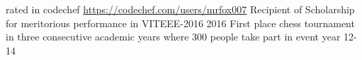 \begin{cvhonors}
   \cvhonor
      {\faStar \faStar \faStar \faStar}{rated in codechef \url{https://codechef.com/users/mrfox007} }{}{}
   \cvhonor
      {Recipient of Scholarship}{ for meritorious performance in VITEEE-2016}
      {}{2016}
   \cvhonor
      {First place}
      {chess tournament in three consecutive academic years where 300 people take part in event year}
      {}{12-14}
\end{cvhonors}
